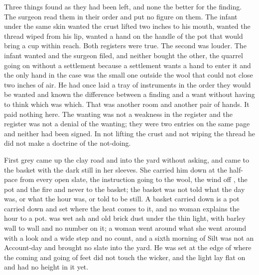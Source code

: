 Three things found as they had been left, and none the better for the finding. The surgeon read them in their order and put no figure on them. The infant under the same skin wanted the crust lifted two inches to his mouth, wanted the thread wiped from his lip, wanted a hand on the handle of the pot that would bring a cup within reach. Both registers were true. The second was louder. The infant wanted and the surgeon filed, and neither bought the other, the quarrel going on without a settlement because a settlement wants a hand to enter it and the only hand in the case was the small one outside the wool that could not close two inches of air. He had once laid a tray of instruments in the order they would be wanted and known the difference between a finding and a want without having to think which was which. That was another room and another pair of hands. It paid nothing here. The wanting was not a weakness in the register and the register was not a denial of the wanting; they were two entries on the same page and neither had been signed. In not lifting the crust and not wiping the thread he did not make a doctrine of the not-doing.

\scenebreak

First grey came up the clay road and into the yard without asking, and  came to the basket with the dark still in her sleeves. She carried him down  at the half-pace from every open slate, the instruction going to the wool, the wind off , the pot and the fire and never to the basket; the basket was not told what the day was, or what the hour was, or told to be still. A basket carried down is a pot carried down and set where the heat comes to it, and no woman explains the hour to a pot.  was wet ash and old brick dust under the thin light, with barley wall to wall and no number on it; a woman went around what she went around with a look and a wide step and no count, and a sixth morning of Silt was not an Account-day and brought no slate into the yard. He was set at the edge of  where the coming and going of feet did not touch the wicker, and the light lay flat on  and had no height in it yet.

